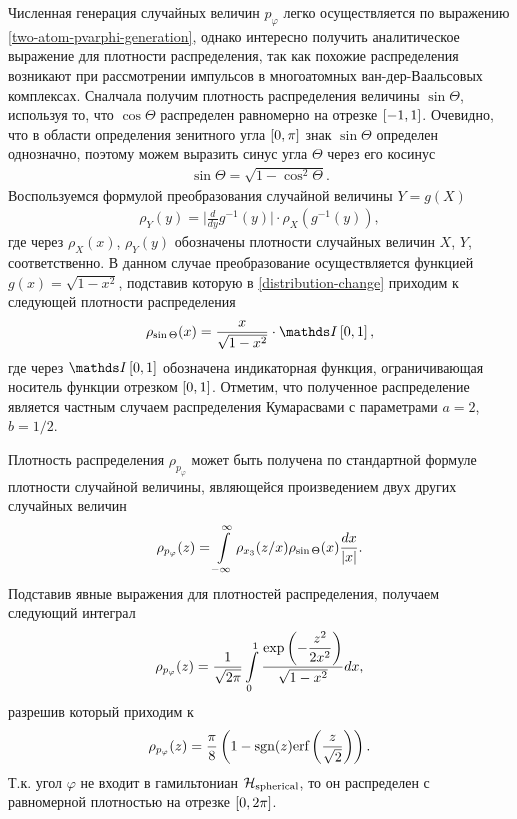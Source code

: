 Численная генерация случайных величин $p_\varphi$ легко осуществляется по выражению \eqref{two-atom-pvarphi-generation}, однако интересно получить аналитическое выражение для плотности распределения, так как похожие распределения возникают при рассмотрении импульсов в многоатомных ван-дер-Ваальсовых комплексах. Сналчала получим плотность распределения величины $\sin \Theta$, используя то, что $\cos \Theta$ распределен равномерно на отрезке $\left[ -1, 1\right]$. Очевидно, что в области определения зенитного угла $\left[ 0, \pi \right]$ знак $\sin \Theta$ определен однозначно, поэтому можем выразить синус угла $\Theta$ через его косинус
\begin{gather}
    \sin \Theta = \sqrt{ 1 - \cos^2 \Theta}.
\end{gather}
Воспользуемся формулой преобразования случайной величины $Y = g(X)$
\begin{gather}
    \rho_Y(y) = \Big\vert \frac{d}{dy} g^{-1}(y) \Big\vert \cdot \rho_X(g^{-1}(y)), \label{distribution-change}
\end{gather}
%
где через $\rho_X(x)$, $\rho_Y(y)$ обозначены плотности случайных величин $X$, $Y$, соответственно. В данном случае преобразование осуществляется функцией $g(x) = \sqrt{1 - x^2}$, подставив которую в \eqref{distribution-change} приходим к следующей плотности распределения  
\begin{gather}
    \rho_{\sin \Theta}(x) = \frac{x}{\sqrt{1 - x^2}} \cdot \bbI\lsq 0, 1\rsq,
\end{gather}
% 
где через $\bbI\lsq 0, 1 \rsq$ обозначена индикаторная функция, ограничивающая носитель функции отрезком $\left[ 0, 1 \right]$. Отметим, что полученное распределение является частным случаем распределения Кумарасвами с параметрами $a = 2$, $b = 1/2$. \par
Плотность распределения $\rho_{p_\varphi}$ может быть получена по стандартной формуле плотности случайной величины, являющейся произведением двух других случайных величин
\begin{gather}
    \rho_{p_\varphi}(z) = \int\limits_{-\infty}^\infty \rho_{x_3}(z/x) \rho_{\sin \Theta}(x) \frac{dx}{\vert x \vert}.
\end{gather}
Подставив явные выражения для плотностей распределения, получаем следующий интеграл
\begin{gather}
    \rho_{p_\varphi}(z) = \frac{1}{\sqrt{2 \pi}} \int\limits_0^1 \frac{\displaystyle \exp \left( -\frac{z^2}{2x^2} \right)}{\sqrt{1 - x^2}} dx,
\end{gather}
%
разрешив который приходим к
\begin{gather}
    \rho_{p_\varphi}(z) = \frac{\pi}{8} \left( 1 - \text{sgn}(z) \text{erf} \left( \frac{z}{\sqrt{2}} \right) \right).
\end{gather}
Т.к. угол $\varphi$ не входит в гамильтониан $\mathcal{H}_\text{spherical}$, то он распределен с равномерной плотностью на отрезке $\left[ 0, 2 \pi \right]$.


